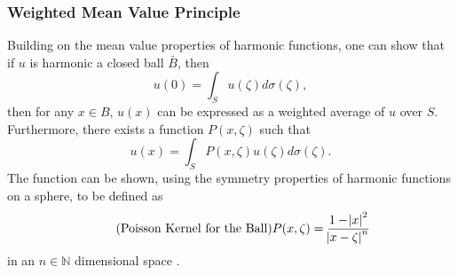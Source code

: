   \subsubsection{Weighted Mean Value Principle}
  Building on the mean value properties of harmonic functions, one can show that if $u$ is harmonic a
  closed ball $\bar{B}$, then
   \begin{equation}
     u(0) = \int_{S}u(\zeta)d\sigma(\zeta),
     \label{eq:centerval}
    \end{equation}
  then for any $x \in B\text{, }u(x)$ can be expressed as a weighted average of
  $u$ over $S$. Furthermore, there exists a function $P(x,\zeta)$ such that
  \begin{equation}u(x)=\int_{S}P(x,\zeta)u(\zeta)d\sigma(\zeta).\label{eq:weighted_average_integral} \end{equation}
     The function can be shown,
  using the symmetry properties of harmonic functions on a sphere, to be defined as
  \begin{equation}
    \tag{Poisson Kernel for the Ball}
    P(x,\zeta) = \frac{1 - \abs{x}^{2}}{\abs{x- \zeta}^{n}}
    \label{eq:poissonkernel}
  \end{equation}
  in an $n \in \mathbb{N}$ dimensional space \cite{Axler1992}.
